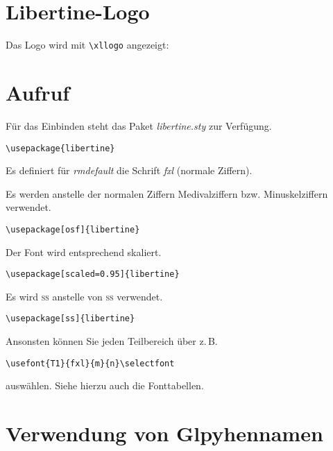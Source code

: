 \documentclass{fontdokuold}
\begin{document}
\section{Libertine-Logo}

Das Logo wird mit \verb|\xllogo| angezeigt: {\Huge\xllogo}


\section{Aufruf}

Für das Einbinden steht das Paket \textit{libertine.sty} zur Verfügung.

\begin{lstlisting}
\usepackage{libertine}
\end{lstlisting}

Es definiert für \textit{rmdefault} die Schrift \textit{fxl} (normale Ziffern).


\begin{description}
\item [osf] Es werden anstelle der normalen Ziffern Medivalziffern bzw. Minuskelziffern verwendet.
\begin{lstlisting}
\usepackage[osf]{libertine}
\end{lstlisting}

\item [scaled] Der Font wird entsprechend skaliert.
\begin{lstlisting}
\usepackage[scaled=0.95]{libertine}
\end{lstlisting}

\item [ss] Es wird \textsc{ss} anstelle von \textsc{ß} verwendet.
\begin{lstlisting}
\usepackage[ss]{libertine}
\end{lstlisting}

\end{description}

Ansonsten können Sie jeden Teilbereich über z.\,B.
\begin{lstlisting}
\usefont{T1}{fxl}{m}{n}\selectfont
\end{lstlisting}
auswählen. Siehe hierzu auch die Fonttabellen.


\section{Verwendung von Glpyhennamen}
\end{document}
